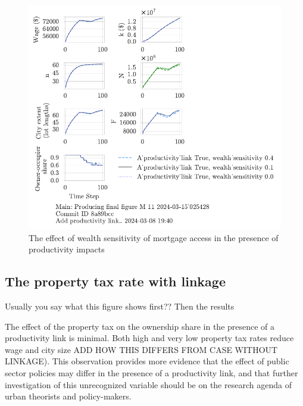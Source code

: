 {\begin{figure}[h!bt]
    \centering
    \includegraphics[scale=1, trim={0 1.4cm 0 0},clip]{fig/With-productivity_link-wealth_sensitivity-025428.pdf}
    \caption{The effect of wealth sensitivity of mortgage access in the presence of productivity impacts}
    \label{fig:Productivity_link_and_wealth_sensitivity_ownership_trajectory}
\end{figure}


\newpage
\subsection{The property tax rate  with linkage}
{\color{red} Usually you say what this figure shows first?? Then the results}

The effect of the property tax on the ownership share in the presence of a productivity link is minimal. Both high and very low property tax rates reduce wage and city size {\color{red} ADD HOW THIS DIFFERS FROM CASE WITHOUT LINKAGE).}  This observation provides more evidence that the effect of public sector policies may differ in the presence of a productivity link, and that further investigation of this unrecognized variable should be on the research agenda of urban theorists and policy-makers.

}
